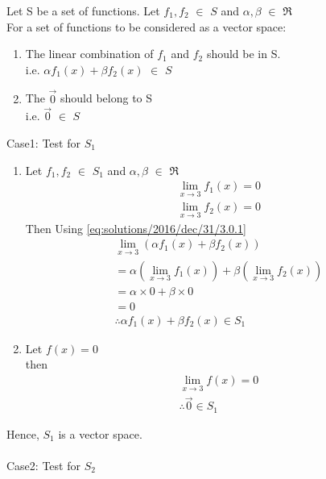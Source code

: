 Let S be a set of functions.
Let $f_1,f_2$ $\in$ $S$ and $\alpha,\beta$ $\in$ $\Re$\\
 For a set of functions to be considered as a vector space:
\begin{enumerate}
\item The linear combination of $f_1$ and $f_2$ should be in S.\\
i.e. $\alpha f_1(x) + \beta f_2(x)$ $\in$ $S$
\item The $\vec{0}$ should belong to S\\
i.e. $\vec{0}$ $\in$ $S$
\end{enumerate}
Case1: Test for $S_1$
\begin{enumerate}
\item Let $f_1,f_2$ $\in$ $S_1$ and $\alpha,\beta$ $\in$ $\Re$
\begin{equation}\label{eq:solutions/2016/dec/31/3.0.1}
\begin{split}
\lim_{x\to3} f_1(x) = 0\\
\lim_{x\to3} f_2(x) = 0
\end{split}
\end{equation}
Then Using \eqref{eq:solutions/2016/dec/31/3.0.1}
\begin{equation*}
\begin{split}
\lim_{x\to3} (\alpha f_1(x) + \beta f_2(x))\\
= \alpha \left(\lim_{x\to3} f_1(x)\right) + \beta \left(\lim_{x\to3} f_2(x)\right)\\
= \alpha \times 0 + \beta \times 0\\
= 0\\
 \therefore \alpha f_1(x) + \beta f_2(x) \in S_1
\end{split}
\end{equation*}
\item Let $f(x) = 0$\\
then 
\begin{equation*}
\begin{split}
\lim_{x\to3} f(x) = 0\\
\therefore \vec{0} \in S_1
\end{split}
\end{equation*}
\end{enumerate}
Hence, $S_1$ is a vector space.\\
\\
Case2: Test for $S_2$
